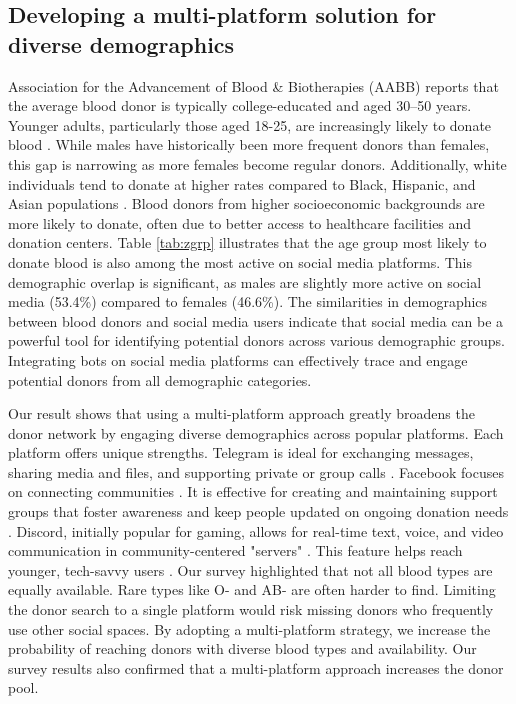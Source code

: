 \documentclass[11pt]{article}
\begin{document}
\subsection{Developing a multi-platform solution for diverse demographics}
Association for the Advancement of Blood \& Biotherapies (AABB) reports that the average blood donor is typically college-educated and aged 30–50 years. Younger adults, particularly those aged 18-25, are increasingly likely to donate blood \cite{35americasbloodcenters2024}. While males have historically been more frequent donors than females, this gap is narrowing as more females become regular donors. Additionally, white individuals tend to donate at higher rates compared to Black, Hispanic, and Asian populations \cite{35americasbloodcenters2024}. Blood donors from higher socioeconomic backgrounds are more likely to donate, often due to better access to healthcare facilities and donation centers. Table \ref{tab:zgrp} illustrates that the age group most likely to donate blood is also among the most active on social media platforms. This demographic overlap is significant, as males are slightly more active on social media (53.4\%) compared to females (46.6\%). The similarities in demographics between blood donors and social media users indicate that social media can be a powerful tool for identifying potential donors across various demographic groups. Integrating bots on social media platforms can effectively trace and engage potential donors from all demographic categories. 

Our result shows that using a multi-platform approach greatly broadens the donor network by engaging diverse demographics across popular platforms. Each platform offers unique strengths. Telegram is ideal for exchanging messages, sharing media and files, and supporting private or group calls \cite{36yinka2018telegram}. Facebook focuses on connecting communities \cite{38rauch2013advancing}. It is effective for creating and maintaining support groups that foster awareness and keep people updated on ongoing donation needs \cite{38rauch2013advancing}. Discord, initially popular for gaming, allows for real-time text, voice, and video communication in community-centered "servers" \cite{37kruglyk2020discord}. This feature helps reach younger, tech-savvy users \cite{37kruglyk2020discord}. Our survey highlighted that not all blood types are equally available. Rare types like O- and AB- are often harder to find. Limiting the donor search to a single platform would risk missing donors who frequently use other social spaces. By adopting a multi-platform strategy, we increase the probability of reaching donors with diverse blood types and availability. Our survey results also confirmed that a multi-platform approach increases the donor pool. 
\end{document}
